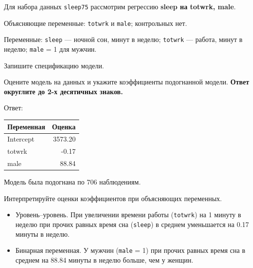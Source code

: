 \documentclass[
  russian,
]{article}
\newcounter{none} %
\providecommand{\tightlist}{%
  \setlength{\itemsep}{0pt}\setlength{\parskip}{0pt}}
\begin{document}
Для набора данных \texttt{sleep75} рассмотрим регрессию \textbf{sleep на
totwrk, male}.

Объясняющие переменные: \texttt{totwrk} и \texttt{male}; контрольных
нет.

Переменные: \texttt{sleep} --- ночной сон, минут в неделю;
\texttt{totwrk} --- работа, минут в неделю; \texttt{male} = 1 для
мужчин.

Запишите спецификацию модели.

Оцените модель на данных и укажите коэффициенты подогнанной модели.
\textbf{Ответ округлите до 2-х десятичных знаков.}

Ответ:

{\def\LTcaptype{none} %
\begin{longtable}[]{@{}lr@{}}
\toprule\noalign{}
Переменная & Оценка \\
\midrule\noalign{}
\endhead
\bottomrule\noalign{}
\endlastfoot
Intercept & 3573.20 \\
totwrk & -0.17 \\
male & 88.84 \\
\end{longtable}
}

Модель была подогнана по 706 наблюдениям.

Интерпретируйте оценки коэффициентов при объясняющих переменных.

\begin{tcolorbox}[enhanced jigsaw, arc=.35mm, bottomrule=.15mm, bottomtitle=1mm, breakable, colback=white, colbacktitle=quarto-callout-tip-color!10!white, colframe=quarto-callout-tip-color-frame, coltitle=black, left=2mm, leftrule=.75mm, opacityback=0, opacitybacktitle=0.6, rightrule=.15mm, title=\textcolor{quarto-callout-tip-color}{\faLightbulb}\hspace{0.5em}{Ответ}, titlerule=0mm, toprule=.15mm, toptitle=1mm]

\begin{itemize}
\tightlist
\item
  Уровень--уровень. При увеличении времени работы (\texttt{totwrk}) на 1
  минуту в неделю при прочих равных время сна (\texttt{sleep}) в среднем
  уменьшается на 0.17 минуты в неделю.
\item
  Бинарная переменная. У мужчин (\texttt{male} = 1) при прочих равных
  время сна в среднем на 88.84 минуты в неделю больше, чем у женщин.
\end{itemize}

\end{tcolorbox}
\end{document}
